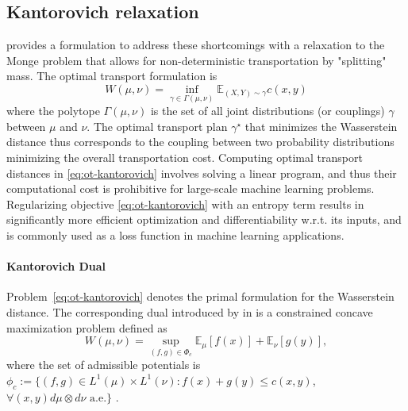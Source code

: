 \subsection{Kantorovich relaxation}  %
\citeauthor{kantorovich1942} provides a formulation to address these shortcomings with a relaxation to the
Monge problem that allows for non-deterministic transportation by "splitting" mass.
The \citet{kantorovich1942} optimal transport formulation is 
\begin{equation}\label{eq:ot-kantorovich}
W(\mu, \nu)= \inf _{\gamma \in \Gamma(\mu, \nu)} \mathbb{E}_{(X, Y) \sim \gamma}c(x, y)
\end{equation}
where the polytope $\Gamma(\mu, \nu)$ is the set of all joint distributions (or couplings) $\gamma$ between $\mu$ and $\nu$.
The optimal transport plan $\gamma^\star$ that minimizes the Wasserstein distance thus corresponds to the coupling between two probability distributions minimizing the overall transportation cost.
Computing optimal transport distances in \eqref{eq:ot-kantorovich} involves solving a linear program,
and thus their computational cost is prohibitive for large-scale machine learning problems.
Regularizing objective \eqref{eq:ot-kantorovich} with an entropy term results in significantly more efficient optimization
\citep{cuturi2013} and differentiability w.r.t. its inputs, and is commonly used as a loss function in machine learning applications.


\paragraph{Kantorovich Dual}
Problem~\eqref{eq:ot-kantorovich} denotes the primal formulation for the Wasserstein distance. The corresponding dual introduced by \citeauthor{kantorovich1942} in \citeyear{kantorovich1942} is a constrained concave maximization problem defined as
\begin{equation} \label{eq:ot-dual}
    W(\mu, \nu)=\sup _{(f, g) \in \Phi_{c}} \mathbb{E}_{\mu}[f(x)]+\mathbb{E}_{\nu}[g(y)],
\end{equation}
where the set of admissible potentials is $\phi_c := \{(f, g) \in L^{1}(\mu) \times L^{1}(\nu): f(x)+g(y) \leq c(x, y)$, $\forall(x, y) d\mu \otimes d\nu \text{ a.e.}\}$ \citep[Theorem 1.3]{villani2003}.

